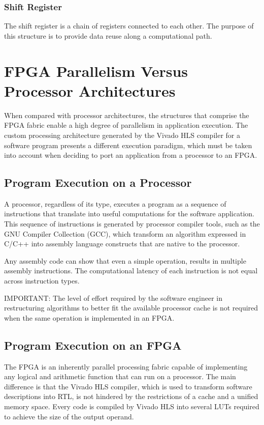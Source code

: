 \subsubsection{Shift Register}
The shift register is a chain of registers connected to each other. The purpose of this
structure is to provide data reuse along a computational path. 


\clearpage
\section{FPGA Parallelism Versus Processor Architectures}
When compared with processor architectures, the structures that comprise the FPGA fabric
enable a high degree of parallelism in application execution. The custom processing
architecture generated by the Vivado HLS compiler for a software program presents a
different execution paradigm, which must be taken into account when deciding to port an
application from a processor to an FPGA. 

\subsection{Program Execution on a Processor}
A processor, regardless of its type, executes a program as a sequence of instructions that
translate into useful computations for the software application. This sequence of
instructions is generated by processor compiler tools, such as the GNU Compiler Collection
(GCC), which transform an algorithm expressed in C/C++ into assembly language
constructs that are native to the processor. 

\par Any assembly code can show that even a simple operation, results in multiple assembly instructions. 
The computational latency of each instruction is not equal across instruction types. 

\begin{highlight}
  IMPORTANT: The level of effort required by the software engineer in restructuring algorithms to better fit the available processor cache is not required when the same operation is implemented in an FPGA.
\end{highlight}

\subsection{Program Execution on an FPGA}
The FPGA is an inherently parallel processing fabric capable of implementing any logical
and arithmetic function that can run on a processor. The main difference is that the Vivado
HLS compiler, which is used to transform software descriptions into RTL, is not hindered by
the restrictions of a cache and a unified memory space. Every code is compiled by Vivado HLS into several LUTs required to achieve the
size of the output operand.

